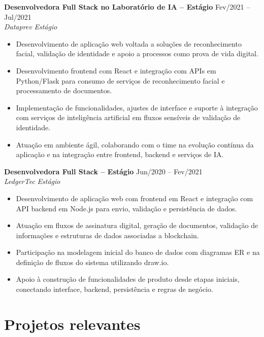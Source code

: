 \documentclass[10pt,a4paper]{article}
\newcommand{\role}[4]{
  \textbf{#1} \hfill #2 \\
  \textit{#3} \hfill \textit{#4}
}
\begin{document}
\role{Desenvolvedora Full Stack no Laboratório de IA -- Estágio}{Fev/2021 -- Jul/2021}{Dataprev}{Estágio}
\begin{itemize}
  \item Desenvolvimento de aplicação web voltada a soluções de reconhecimento facial, validação de identidade e apoio a processos como prova de vida digital.
  \item Desenvolvimento frontend com React e integração com APIs em Python/Flask para consumo de serviços de reconhecimento facial e processamento de documentos.
  \item Implementação de funcionalidades, ajustes de interface e suporte à integração com serviços de inteligência artificial em fluxos sensíveis de validação de identidade.
  \item Atuação em ambiente ágil, colaborando com o time na evolução contínua da aplicação e na integração entre frontend, backend e serviços de IA.
\end{itemize}

\role{Desenvolvedora Full Stack -- Estágio}{Jun/2020 -- Fev/2021}{LedgerTec}{Estágio}
\begin{itemize}
  \item Desenvolvimento de aplicação web com frontend em React e integração com API backend em Node.js para envio, validação e persistência de dados.
  \item Atuação em fluxos de assinatura digital, geração de documentos, validação de informações e estruturas de dados associadas a blockchain.
  \item Participação na modelagem inicial do banco de dados com diagramas ER e na definição de fluxos do sistema utilizando draw.io.
  \item Apoio à construção de funcionalidades de produto desde etapas iniciais, conectando interface, backend, persistência e regras de negócio.
\end{itemize}

\section*{Projetos relevantes}
\end{document}
